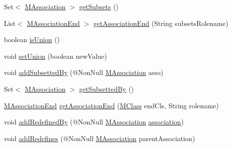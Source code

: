 \begin{DoxyCompactItemize}
\item 
Set$<$ \hyperlink{interfaceorg_1_1tzi_1_1use_1_1uml_1_1mm_1_1_m_association}{M\-Association} $>$ \hyperlink{classorg_1_1tzi_1_1use_1_1uml_1_1mm_1_1_m_association_class_impl_a72ccf1998aa6f112596823161e9af2db}{get\-Subsets} ()
\item 
List$<$ \hyperlink{classorg_1_1tzi_1_1use_1_1uml_1_1mm_1_1_m_association_end}{M\-Association\-End} $>$ \hyperlink{classorg_1_1tzi_1_1use_1_1uml_1_1mm_1_1_m_association_class_impl_a2a0c2ef631e8b4b048a2b1d34f17ac33}{get\-Association\-End} (String subsets\-Rolename)
\item 
boolean \hyperlink{classorg_1_1tzi_1_1use_1_1uml_1_1mm_1_1_m_association_class_impl_a7e715c85bc1880c71c7a2340f3fbf537}{is\-Union} ()
\item 
void \hyperlink{classorg_1_1tzi_1_1use_1_1uml_1_1mm_1_1_m_association_class_impl_a3477c41144650a353e4527ff50792b3b}{set\-Union} (boolean new\-Value)
\item 
void \hyperlink{classorg_1_1tzi_1_1use_1_1uml_1_1mm_1_1_m_association_class_impl_a0865da9d51ced0bc855063a1dac127e1}{add\-Subsetted\-By} (@Non\-Null \hyperlink{interfaceorg_1_1tzi_1_1use_1_1uml_1_1mm_1_1_m_association}{M\-Association} asso)
\item 
Set$<$ \hyperlink{interfaceorg_1_1tzi_1_1use_1_1uml_1_1mm_1_1_m_association}{M\-Association} $>$ \hyperlink{classorg_1_1tzi_1_1use_1_1uml_1_1mm_1_1_m_association_class_impl_a9148045963ae14c73eb58ad4954c3bed}{get\-Subsetted\-By} ()
\item 
\hyperlink{classorg_1_1tzi_1_1use_1_1uml_1_1mm_1_1_m_association_end}{M\-Association\-End} \hyperlink{classorg_1_1tzi_1_1use_1_1uml_1_1mm_1_1_m_association_class_impl_a71a9ed2cf81a9687fb6d57c9527c3c78}{get\-Association\-End} (\hyperlink{interfaceorg_1_1tzi_1_1use_1_1uml_1_1mm_1_1_m_class}{M\-Class} end\-Cls, String rolename)
\item 
void \hyperlink{classorg_1_1tzi_1_1use_1_1uml_1_1mm_1_1_m_association_class_impl_a058032d03f86b728ee3ad45e47fc694f}{add\-Redefined\-By} (@Non\-Null \hyperlink{interfaceorg_1_1tzi_1_1use_1_1uml_1_1mm_1_1_m_association}{M\-Association} \hyperlink{classorg_1_1tzi_1_1use_1_1uml_1_1mm_1_1_m_association_class_impl_a890b52e2cbc4389a4451d7d6fef6b984}{association})
\item 
void \hyperlink{classorg_1_1tzi_1_1use_1_1uml_1_1mm_1_1_m_association_class_impl_a95b51d9b3aaa6f66990057c95ae62065}{add\-Redefines} (@Non\-Null \hyperlink{interfaceorg_1_1tzi_1_1use_1_1uml_1_1mm_1_1_m_association}{M\-Association} parent\-Association)

\end{DoxyCompactItemize}
